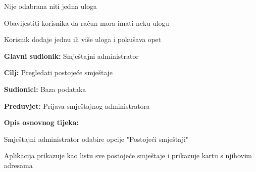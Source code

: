 \begin{packed_item}
\begin{packed_item}
\begin{packed_enum}
						\end{packed_enum}
						\item[2.c] Nije odabrana niti jedna uloga
						\item[] \begin{packed_enum}
							
							\item Obavijestiti korisnika da račun mora imati neku ulogu
							\item Korisnik dodaje jednu ili više uloga i pokušava opet
							
						\end{packed_enum}
						
					\end{packed_item}
				\end{packed_item}
				
				\noindent {}
				\begin{packed_item}
					
					\item \textbf{Glavni sudionik: }Smještajni administrator
					\item  \textbf{Cilj:} Pregledati postojeće smještaje
					\item  \textbf{Sudionici:} Baza podataka
					\item  \textbf{Preduvjet:} Prijava smještajnog administratora
					\item  \textbf{Opis osnovnog tijeka:}
					
					\item[] \begin{packed_enum}
						
						\item Smještajni administrator odabire opcije "Postojeći smještaji"
						\item Aplikacija prikazuje kao listu sve postojeće smještaje i prikazuje kartu s njihovim adresama
					\end{packed_enum}

				\end{packed_item}
				
